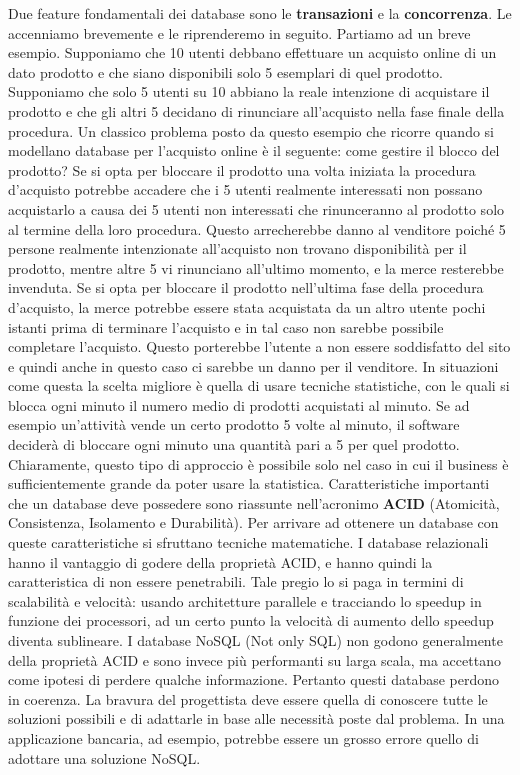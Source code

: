 Due feature fondamentali dei database sono le \textbf{transazioni} e la \textbf{concorrenza}. Le accenniamo brevemente e le riprenderemo in seguito. Partiamo ad un breve esempio. Supponiamo che 10 utenti debbano effettuare un acquisto online di un dato prodotto e che siano disponibili solo 5 esemplari di quel prodotto. Supponiamo che solo 5 utenti su 10 abbiano la reale intenzione di acquistare il prodotto e che gli altri 5 decidano di rinunciare all’acquisto nella 
fase finale della procedura. Un classico problema posto da questo esempio che ricorre quando si modellano database per l’acquisto online è il seguente: come gestire il blocco del prodotto?  Se si opta per bloccare il prodotto una volta iniziata la procedura d’acquisto potrebbe accadere che i 5 utenti realmente interessati non possano acquistarlo a causa dei 5 utenti non interessati che rinunceranno al prodotto solo al termine della loro procedura. Questo arrecherebbe danno al venditore poiché 5 persone realmente intenzionate all’acquisto non trovano disponibilità per il prodotto, mentre altre 5 vi rinunciano all’ultimo momento, e la merce resterebbe invenduta.  Se si opta per bloccare il prodotto nell’ultima fase della procedura d’acquisto, la merce potrebbe essere stata acquistata da un altro utente pochi istanti prima di terminare l’acquisto e in tal caso non sarebbe possibile completare l’acquisto. Questo porterebbe l’utente a non essere soddisfatto del sito e quindi anche in questo caso ci sarebbe un danno per il venditore. In situazioni come questa la scelta migliore è quella di usare tecniche statistiche, con le quali si blocca ogni minuto il numero medio di prodotti acquistati al minuto. Se ad esempio un’attività vende un certo prodotto 5 volte al minuto, il software deciderà di bloccare ogni minuto una quantità pari a 5 per quel prodotto. Chiaramente, questo tipo di approccio è possibile solo nel caso in cui il business è sufficientemente grande da poter usare la statistica. Caratteristiche importanti che un database deve possedere sono riassunte nell’acronimo \textbf{ACID} (Atomicità, Consistenza, Isolamento e Durabilità). Per arrivare ad ottenere un database con queste caratteristiche si sfruttano tecniche matematiche. I database relazionali hanno il vantaggio di godere della proprietà ACID, e hanno quindi la caratteristica di non essere penetrabili. Tale pregio lo si paga in termini di scalabilità e velocità: usando architetture parallele e tracciando lo speedup in funzione dei processori, ad un certo punto la velocità di aumento dello speedup diventa sublineare. I database NoSQL (Not only SQL) non godono generalmente della proprietà ACID e sono invece più performanti su larga scala, ma accettano come ipotesi di perdere qualche informazione. Pertanto questi database perdono in coerenza. La bravura del progettista deve essere quella di conoscere tutte le soluzioni possibili e di adattarle in base alle necessità poste dal problema. In una applicazione bancaria, ad esempio, potrebbe essere un grosso errore quello di adottare una soluzione NoSQL.  


